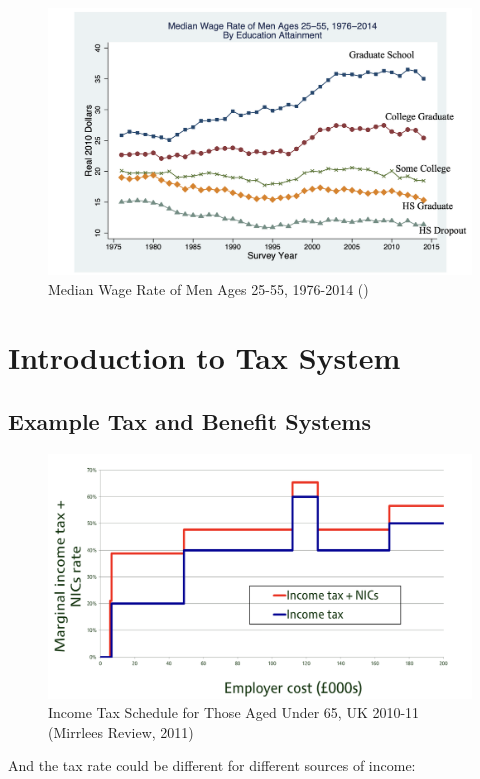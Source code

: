         \begin{figure}[H]
            \centering
            \includegraphics[width=4.5in]{images/ch13/13_inequality_3.png}
            \caption{Median Wage Rate of Men Ages 25-55, 1976-2014 (\cite{blundell_income_2018})}
        \end{figure}

\section{Introduction to Tax System}

    \subsection{Example Tax and Benefit Systems}

        \begin{figure}[H]
            \centering
            \includegraphics[width=4.5in]{images/ch13/13_taxscheme_1.png}
            \caption{Income Tax Schedule for Those Aged Under 65, UK 2010-11 (Mirrlees Review, 2011)}
        \end{figure}

        And the tax rate could be different for different sources of income:
        
